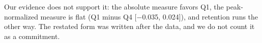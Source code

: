 Our evidence does not support it: the absolute measure favors Q1, the peak-normalized measure is flat (Q1 minus Q4 [$-$0.035, 0.024]), and retention runs the other way. The restated form was written after the data, and we do not count it as a commitment.%
